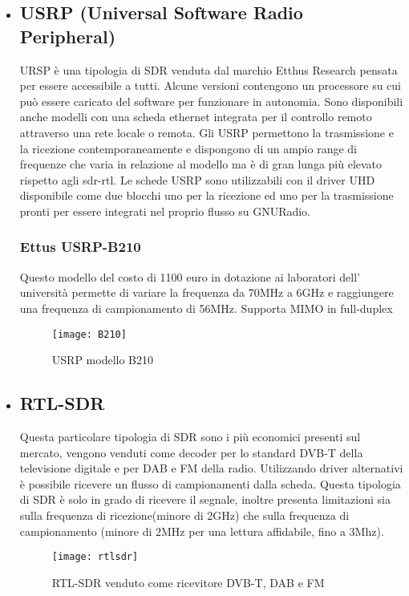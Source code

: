 \begin{itemize}
\item \subsection{USRP (Universal Software Radio Peripheral)} URSP è una tipologia di SDR venduta dal marchio Etthus Research pensata per essere accessibile a tutti. Alcune versioni contengono un processore su cui può essere caricato del software per funzionare in autonomia. Sono disponibili anche modelli con una scheda ethernet integrata per il controllo remoto attraverso una rete locale o remota. Gli USRP permettono la trasmissione e la ricezione contemporaneamente e dispongono di un ampio range di frequenze che varia in relazione al modello ma è di gran lunga più elevato rispetto agli sdr-rtl. Le schede USRP sono utilizzabili con il driver UHD disponibile come due blocchi uno per la ricezione ed uno per la trasmissione pronti per essere integrati nel proprio flusso su GNURadio.
\subsubsection{Ettus USRP-B210}
Questo modello del costo di 1100 euro in dotazione ai laboratori dell' università permette di variare la frequenza da 70MHz a 6GHz e raggiungere una frequenza di campionamento di 56MHz. Supporta MIMO in full-duplex
\begin{figure}[h]
	\centering
	\texttt{[image: B210]}
	\caption{USRP modello B210\cite{b210}}\label{fig:1}
\end{figure}


\item \subsection{RTL-SDR} Questa particolare tipologia di SDR sono i più economici presenti sul mercato, vengono venduti come decoder per lo standard DVB-T della televisione digitale e per DAB e FM della radio. Utilizzando driver alternativi è possibile ricevere un flusso di campionamenti dalla scheda. Questa tipologia di SDR è solo in grado di ricevere il segnale, inoltre presenta limitazioni sia sulla frequenza di ricezione(minore di 2GHz) che sulla frequenza di campionamento (minore di 2MHz per una lettura affidabile, fino a 3Mhz).
\begin{figure}[h]
	\centering
	\texttt{[image: rtlsdr]}
	\caption{RTL-SDR venduto come ricevitore DVB-T, DAB e FM\cite{rtlsdr}}\label{fig:1}
\end{figure}


\end{itemize}
